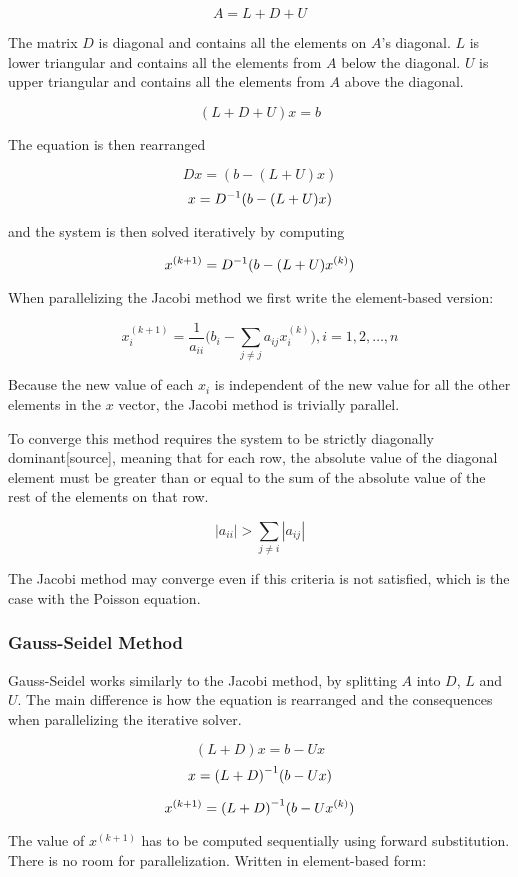 $$A = L+D+U$$

The matrix $D$ is diagonal and contains all the elements on $A$'s diagonal. $L$ 
is lower triangular and contains all the elements from $A$ below the diagonal. 
$U$ is upper triangular and contains all the elements from $A$ above the diagonal.

$$(L+D+U)x = b$$

The equation is then rearranged 

$$Dx = (b - (L+U)x)$$
$$x = {D}^{-1}(b - (L+U)x)$$

and the system is then solved iteratively by computing 

$$x^{(k+1)} = {D}^{-1}(b - (L+U)x^{(k)})$$

When parallelizing the Jacobi method we first write the element-based version:

$$ x_i^{(k+1)} = \frac{1}{a_{ii}} \Big( b_i - \sum_{j \neq j} a_{ij} x_i^{(k)} \Big), i = 1, 2, \ldots, n $$

Because the new value of each $x_i$ is independent of the new value for all the 
other elements in the $x$ vector, the Jacobi method is trivially parallel.

To converge this method requires the system to be strictly diagonally dominant[source],
meaning that for each row, the absolute value of the diagonal element must be
greater than or equal to the sum of the absolute value of the rest of the
elements on that row.

$$|a_{ii}| > \sum_{j \neq i} |a_{ij}|$$

The Jacobi method may converge even if this criteria is not satisfied, which is
the case with the Poisson equation.

\subsubsection*{Gauss-Seidel Method}

Gauss-Seidel works similarly to the Jacobi method, by splitting $A$ into $D$, 
$L$ and $U$. The main difference is how the equation is rearranged and the consequences 
when parallelizing the iterative solver. 

$$(L+D)x = b - Ux$$
$$x = {(L+D)}^{-1}(b - Ux)$$

$$x^{(k+1)} = {(L+D)}^{-1}(b - Ux^{(k)})$$

The value of $x^{(k+1)}$ has to be computed sequentially using forward substitution. 
There is no room for parallelization. Written in element-based form:

